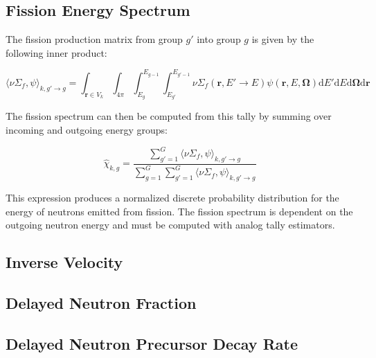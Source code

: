 \subsection{Fission Energy Spectrum}
\label{subsubsec:tally-types-chi}

The fission production matrix from group $g'$ into group $g$ is given by the following inner product:

\begin{equation}
\label{eqn:nu-fiss-energies}
\langle \nu\Sigma_{f}, \psi \rangle_{k,g'\rightarrow g} = \int_{\mathbf{r} \in V_{k}} \int_{4\pi} \int_{E_{g}}^{E_{g-1}} \int_{E_{g'}}^{E_{g'-1}} \nu\Sigma_{f}(\mathbf{r},E'\rightarrow E)\psi(\mathbf{r},E,\mathbf{\Omega}) \mathrm{d}E'\mathrm{d}E\mathrm{d}\mathbf{\Omega}\mathrm{d}\mathbf{r}
\end{equation}

\noindent The fission spectrum can then be computed from this tally by summing over incoming and outgoing energy groups:

\begin{equation}
\label{eqn:chi}
\hat{\chi}_{k,g} = \frac{\displaystyle\sum\limits_{g'=1}^{G} \langle \nu\Sigma_{f}, \psi \rangle_{k,g'\rightarrow g}}{\displaystyle\sum\limits_{g=1}^{G} \displaystyle\sum\limits_{g'=1}^{G} \langle \nu\Sigma_{f}, \psi \rangle_{k,g'\rightarrow g}}
\end{equation}

\noindent This expression produces a normalized discrete probability distribution for the energy of neutrons emitted from fission. The fission spectrum is dependent on the outgoing neutron energy and must be computed with analog tally estimators.

\subsection{Inverse Velocity}
\label{subsubsec:tally-types-inv-vel}

\subsection{Delayed Neutron Fraction}
\label{subsubsec:tally-types-beta}

\subsection{Delayed Neutron Precursor Decay Rate}
\label{subsubsec:tally-types-lambda}

